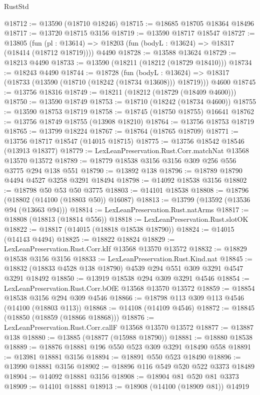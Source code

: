 \begin{lexlean}{RustStd}
\begin{coremodule}
@18712 := @13590 (@18710 @18246)
@18715 := @18685 @18705 @18364 @18496
@18717 := @13720 @18715 @3156
@18719 := @13590 @18717 @18547
@18727 := @13805
    (fun (pl : @13614) => @18203 (fun (bodyL : @13624) => @18317 (@18414 (@18712 @18719))))
    @4490
@18728 := @13588 @13624
@18729 := @18213 @4490
@18733 := @13590 (@18211 (@18212 (@18729 @18410)))
@18734 := @18243 @4490
@18744 := @18728
    (fun (bodyL : @13624) => @18317 (@18733 (@13590 (@18710 (@18242 (@18734 @13608))) @18719)))
    @4600
@18745 := @13756 @18316
@18749 := @18211 (@18212 (@18729 (@18409 @4600)))
@18750 := @13590 @18749
@18753 := @18710 (@18242 (@18734 @4600))
@18755 := @13590 @18753 @18719
@18758 := @18745 (@18750 @18755) @16641
@18762 := @13756 @18749 @18755 (@13908 @18210)
@18764 := @13756 @18753 @18719
@18765 := @13799 @18224
@18767 := @18764 (@18765 @18709)
@18771 := @13756 @18717 @18547 (@14015 @18715)
@18775 := @13756 @18542 @18546 (@13913 @18377)
@18779 := LexLeanPreservation.Rust.Corr.matchNat @13568 @13570 @13572
@18789 := @18779 @18538 @3156 @3156 @309 @256 @556 @3775 @294 @138 @551
@18790 := @13892 @138
@18796 := @18789 @18790 @4494 @4527 @3258 @3291 @18494
@18798 := @14092 @18538 @3156
@18802 := @18798 @50 @53 @50 @3775
@18803 := @14101 @18538
@18808 := @18796 (@18802 (@14100 (@18803 @50)) @16087)
@18813 := @13799 (@13592 (@13536 @94 (@13663 @94)))
@18814 := LexLeanPreservation.Rust.natArms
@18817 := @18808 (@18813 (@18814 @556))
@18818 := LexLeanPreservation.Rust.slotOK
@18822 := @18817 (@14015 (@18818 @18538 @18790))
@18824 := @14015 (@14143 @4494)
@18825 := @18822 @18824
@18829 := LexLeanPreservation.Rust.Corr.kIf @13568 @13570 @13572
@18832 := @18829 @18538 @3156 @3156
@18833 := LexLeanPreservation.Rust.Kind.nat
@18845 := @18832 (@18833 @4528 @138 @18790) @4539 @294 @551 @309 @3291 @4547 @3291 @18492
@18850 := @13919 @18538 @294 @309 @3291 @4546
@18854 := LexLeanPreservation.Rust.Corr.bOfE @13568 @13570 @13572
@18859 := @18854 @18538 @3156 @294 @309 @4546
@18866 := @18798 @113 @309 @113 @4546 (@14100 (@18803 @113))
@18868 := @14108 (@14109 @4546)
@18872 := @18845 (@18850 (@18859 (@18866 @18868)))
@18876 := LexLeanPreservation.Rust.Corr.callF @13568 @13570 @13572
@18877 := @13887 @138
@18880 := @13885 (@18877 (@15988 @18790))
@18881 := @18880 @18538
@18889 := @18876 @18881 @196 @550 @523 @309 @3291 @18490 @558
@18891 := @13981 @18881 @3156
@18894 := @18891 @550 @523 @18490
@18896 := @13990 @18881 @3156
@18902 := @18896 @116 @549 @520 @522 @3373 @18489
@18904 := @14092 @18881 @3156
@18908 := @18904 @81 @520 @81 @3373
@18909 := @14101 @18881
@18913 := @18908 (@14100 (@18909 @81)) @14919

\end{coremodule}
\end{lexlean}
